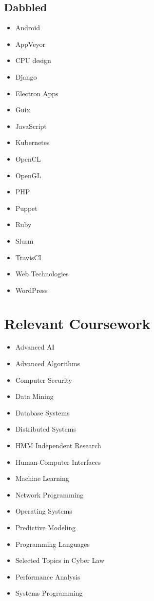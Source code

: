 \documentclass[10pt,a4paper,sans]{moderncv}        %
\begin{document}
\subsection{Dabbled}

\begin{multicols}{3}
\begin{itemize}

\item Android
\item AppVeyor
\item CPU design
\item Django
\item Electron Apps
\item Guix
\item JavaScript
\item Kubernetes
\item OpenCL
\item OpenGL
\item PHP
\item Puppet
\item Ruby
\item Slurm
\item TravisCI
\item Web Technologies
\item WordPress


\end{itemize}
\end{multicols}


\section{Relevant Coursework}

\begin{multicols}{3}
\begin{itemize}

\item Advanced AI
\item Advanced Algorithms
\item Computer Security
\item Data Mining
\item Database Systems
\item Distributed Systems
\item HMM Independent Research
\item Human-Computer Interfaces
\item Machine Learning
\item Network Programming
\item Operating Systems
\item Predictive Modeling
\item Programming Languages
\item Selected Topics in Cyber Law
\item Performance Analysis
\item Systems Programming

\end{itemize}
\end{multicols}
\end{document}
